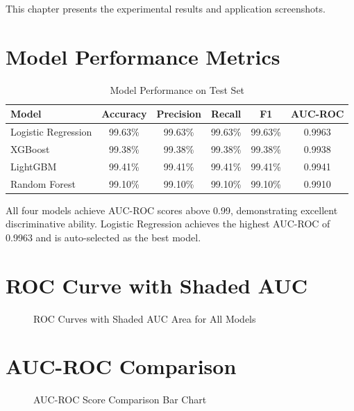 \documentclass[12pt,a4paper]{report}
\begin{document}
This chapter presents the experimental results and application screenshots.

\section{Model Performance Metrics}

\begin{table}[H]
\centering
\caption{Model Performance on Test Set}\label{tab:results}
\begin{tabular}{|l|c|c|c|c|c|}
\hline
\rowcolor{headercolor}
\color{white}\textbf{Model} & \color{white}\textbf{Accuracy} & \color{white}\textbf{Precision} & \color{white}\textbf{Recall} & \color{white}\textbf{F1} & \color{white}\textbf{AUC-ROC} \\
\hline
Logistic Regression & 99.63\% & 99.63\% & 99.63\% & 99.63\% & 0.9963 \\
\hline
XGBoost & 99.38\% & 99.38\% & 99.38\% & 99.38\% & 0.9938 \\
\hline
LightGBM & 99.41\% & 99.41\% & 99.41\% & 99.41\% & 0.9941 \\
\hline
Random Forest & 99.10\% & 99.10\% & 99.10\% & 99.10\% & 0.9910 \\
\hline
\end{tabular}
\end{table}

All four models achieve AUC-ROC scores above 0.99, demonstrating excellent discriminative ability. Logistic Regression achieves the highest AUC-ROC of 0.9963 and is auto-selected as the best model.

\section{ROC Curve with Shaded AUC}

\begin{figure}[H]
\centering
{}
\caption{ROC Curves with Shaded AUC Area for All Models}
\label{fig:roc}
\end{figure}

\section{AUC-ROC Comparison}

\begin{figure}[H]
\centering
{}
\caption{AUC-ROC Score Comparison Bar Chart}
\label{fig:auc}
\end{figure}
\end{document}

